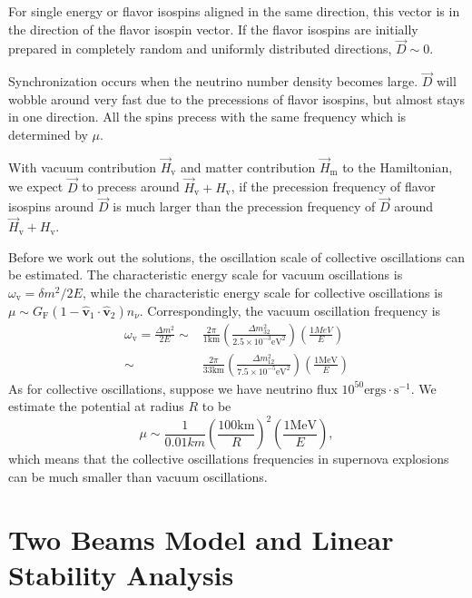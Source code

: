 For single energy or flavor isospins aligned in the same direction, this vector is in the direction of the flavor isospin vector. If the flavor isospins are initially prepared in completely random and uniformly distributed directions, $\vec D\sim 0$.

Synchronization occurs when the neutrino number density becomes large. $\vec D$ will wobble around very fast due to the precessions of flavor isospins, but almost stays in one direction. All the spins precess with the same frequency which is determined by $\mu$.

With vacuum contribution $\vec H_{\mathrm v}$ and matter contribution $\vec H_{\mathrm m}$ to the Hamiltonian, we expect $\vec D$ to precess around $\vec H_{\mathrm v} + H_{\mathrm v}$, if the precession frequency of flavor isospins around $\vec D$ is much larger than the precession frequency of $\vec D$ around  $\vec H_{\mathrm v} + H_{\mathrm v}$.


Before we work out the solutions, the oscillation scale of collective oscillations can be estimated. The characteristic energy scale for vacuum oscillations is $\omega_{\mathrm v} = \delta m^2\big/2E $, while the characteristic energy scale for collective oscillations is $\mu \sim G_{\mathrm F} (1- \hat{\boldsymbol{ v} }_1 \cdot \hat{\boldsymbol{v}}_2) n_{\nu} $. Correspondingly, the vacuum oscillation frequency is
\begin{align*}
 \omega_{\mathrm v} = \frac{\Delta m^2}{2E}  \sim& \frac{2\pi}{ 1  \mathrm{km} }  \left(\frac{\Delta m^2_{32}}{2.5\times 10^{-3} \mathrm{eV}^2 } \right) \left( \frac{1MeV}{E} \right) \\
\sim & \frac{2\pi}{ 33  \mathrm{km} } \left( \frac{\Delta m_{12}^2}{7.5\times 10^{-5}\mathrm{eV}^2} \right) \left( \frac{1\mathrm{MeV}}{E} \right)
\end{align*}
As for collective oscillations, suppose we have neutrino flux $10^{50}\mathrm{ergs\cdot s^{-1}}$. We estimate the potential at radius $R$ to be
\begin{equation*}
\mu \sim  \frac{1}{0.01 km} \left(\frac{100\mathrm{km}}{R}\right)^2 \left(\frac{1\mathrm{MeV}}{E}\right),
\end{equation*}
which means that the collective oscillations frequencies in supernova explosions can be much smaller than vacuum oscillations.



\section{\label{chap:collective-sec:two-beams}Two Beams Model and Linear Stability Analysis}

